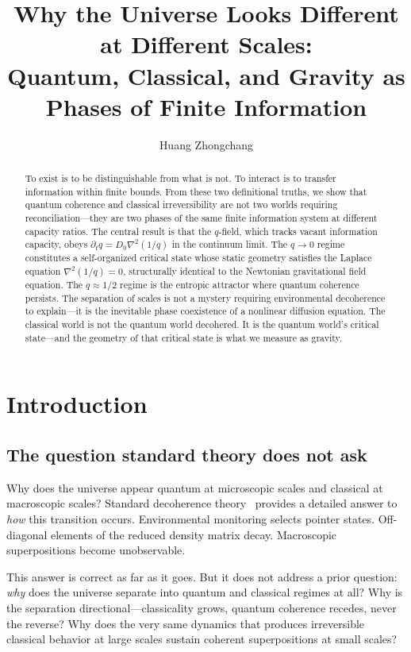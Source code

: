 \documentclass[reprint]{revtex4-2}
\begin{document}
\title{Why the Universe Looks Different at Different Scales: \\
Quantum, Classical, and Gravity as Phases of Finite Information}

\author{Huang Zhongchang}

\begin{abstract}
To exist is to be distinguishable from what is not. To interact is to transfer information within finite bounds. From these two definitional truths, we show that quantum coherence and classical irreversibility are not two worlds requiring reconciliation---they are two phases of the same finite information system at different capacity ratios. The central result is that the $q$-field, which tracks vacant information capacity, obeys $\partial_t q = D_0\nabla^2(1/q)$ in the continuum limit. The $q\to 0$ regime constitutes a self-organized critical state whose static geometry satisfies the Laplace equation $\nabla^2(1/q)=0$, structurally identical to the Newtonian gravitational field equation. The $q\approx 1/2$ regime is the entropic attractor where quantum coherence persists. The separation of scales is not a mystery requiring environmental decoherence to explain---it is the inevitable phase coexistence of a nonlinear diffusion equation. The classical world is not the quantum world decohered. It is the quantum world's critical state---and the geometry of that critical state is what we measure as gravity.
\end{abstract}

\section{Introduction}

\subsection{The question standard theory does not ask}

Why does the universe appear quantum at microscopic scales and classical at macroscopic scales? Standard decoherence theory~\cite{Zurek2003,Schlosshauer2007} provides a detailed answer to \emph{how} this transition occurs. Environmental monitoring selects pointer states. Off-diagonal elements of the reduced density matrix decay. Macroscopic superpositions become unobservable.

This answer is correct as far as it goes. But it does not address a prior question: \emph{why} does the universe separate into quantum and classical regimes at all? Why is the separation directional---classicality grows, quantum coherence recedes, never the reverse? Why does the very same dynamics that produces irreversible classical behavior at large scales sustain coherent superpositions at small scales?
\end{document}
